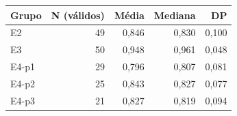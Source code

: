 \begin{tabular}{lrrrr}
\toprule
Grupo & N (válidos) & Média & Mediana & DP \\
\midrule
E2 & 49 & 0,846 & 0,830 & 0,100 \\
E3 & 50 & 0,948 & 0,961 & 0,048 \\
E4-p1 & 29 & 0,796 & 0,807 & 0,081 \\
E4-p2 & 25 & 0,843 & 0,827 & 0,077 \\
E4-p3 & 21 & 0,827 & 0,819 & 0,094 \\
\bottomrule
\end{tabular}
